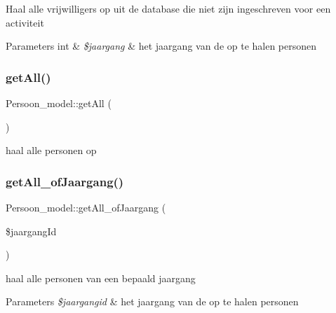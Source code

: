 Haal alle vrijwilligers op uit de database die niet zijn ingeschreven voor een activiteit 
\begin{DoxyParams}[1]{Parameters}
int & {\em \$jaargang} & het jaargang van de op te halen personen \\
\hline
\end{DoxyParams}
\mbox{\label{class_persoon__model_a82a921cf28a86b52a32d48235e30c0f1}} 
\subsubsection{\texorpdfstring{get\+All()}{getAll()}}
{\footnotesize\ttfamily Persoon\+\_\+model\+::get\+All (\begin{DoxyParamCaption}{ }\end{DoxyParamCaption})}

haal alle personen op \mbox{\label{class_persoon__model_ad60023155e1b4bf3279227284647bc2d}} 
\subsubsection{\texorpdfstring{get\+All\+\_\+of\+Jaargang()}{getAll\_ofJaargang()}}
{\footnotesize\ttfamily Persoon\+\_\+model\+::get\+All\+\_\+of\+Jaargang (\begin{DoxyParamCaption}\item[{}]{\$jaargang\+Id }\end{DoxyParamCaption})}

haal alle personen van een bepaald jaargang 
\begin{DoxyParams}{Parameters}
{\em \$jaargangid} & het jaargang van de op te halen personen \\
\hline
\end{DoxyParams}
\mbox{\label{class_persoon__model_abe2394803431cfb447887c36bba2b8eb}} 
